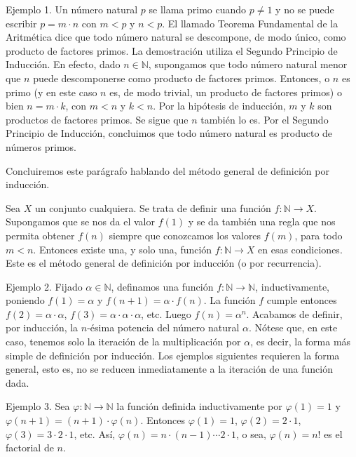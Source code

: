 Ejemplo 1. Un número natural \( p \) se llama primo cuando \( p \neq 1 \) y no se puede escribir \( p = m \cdot n \) con \( m < p \) y \( n < p \). El llamado Teorema Fundamental de la Aritmética dice que todo número natural se descompone, de modo único, como producto de factores primos. La demostración utiliza el Segundo Principio de Inducción. En efecto, dado \( n \in \mathbb{N} \), supongamos que todo número natural menor que \( n \) puede descomponerse como producto de factores primos. Entonces, o \( n \) es primo (y en este caso \( n \) es, de modo trivial, un producto de factores primos) o bien \(n = m \cdot k\), con \(m < n\) y \(k < n\). Por la hipótesis de inducción, \(m\) y \(k\) son productos de factores primos. Se sigue que \(n\) también lo es. Por el Segundo Principio de Inducción, concluimos que todo número natural es producto de números primos.

Concluiremos este parágrafo hablando del método general de definición por inducción.

Sea \(X\) un conjunto cualquiera. Se trata de definir una función \(f: \mathbb{N} \to X\). Supongamos que se nos da el valor \(f(1)\) y se da también una regla que nos permita obtener \(f(n)\) siempre que conozcamos los valores \(f(m)\), para todo \(m < n\). Entonces existe una, y solo una, función \(f: \mathbb{N} \to X\) en esas condiciones. Este es el método general de definición por inducción (o por recurrencia).

Ejemplo 2. Fijado \(\alpha \in \mathbb{N}\), definamos una función \(f: \mathbb{N} \to \mathbb{N}\), inductivamente, poniendo \(f(1) = \alpha\) y \(f(n+1) = \alpha \cdot f(n)\). La función \(f\) cumple entonces \(f(2) = \alpha \cdot \alpha\), \(f(3) = \alpha \cdot \alpha \cdot \alpha\), etc. Luego \(f(n) = \alpha^n\). Acabamos de definir, por inducción, la \(n\)-ésima potencia del número natural \(\alpha\). Nótese que, en este caso, tenemos solo la iteración de la multiplicación por \(\alpha\), es decir, la forma más simple de definición por inducción. Los ejemplos siguientes requieren la forma general, esto es, no se reducen inmediatamente a la iteración de una función dada.

Ejemplo 3. Sea \(\varphi: \mathbb{N} \to \mathbb{N}\) la función definida inductivamente por \(\varphi(1) = 1\) y \(\varphi(n+1) = (n+1) \cdot \varphi(n)\). Entonces \(\varphi(1) = 1\), \(\varphi(2) = 2 \cdot 1\), \(\varphi(3) = 3 \cdot 2 \cdot 1\), etc. Así, \(\varphi(n) = n \cdot (n-1) \cdots 2 \cdot 1\), o sea, \(\varphi(n) = n!\) es el factorial de \(n\).

